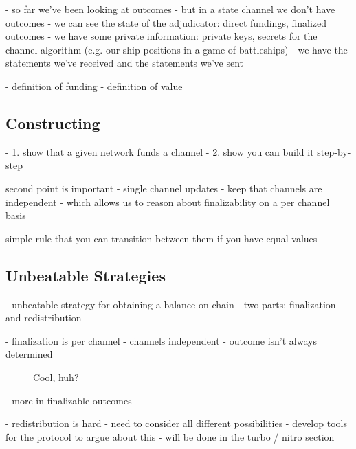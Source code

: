 \begin{figure}[h]\centering
  \makebox[\textwidth][c]{}
  \caption{
  }\label{fig:indirect-funding}
\end{figure}

- so far we've been looking at outcomes
- but in a state channel we don't have outcomes
- we can see the state of the adjudicator: direct fundings, finalized outcomes
- we have some private information: private keys, secrets for the channel algorithm (e.g. our ship positions in a game of battleships)
- we have the statements we've received and the statements we've sent

\begin{figure}[h]\centering
  \makebox[\textwidth][c]{}
  \caption{
  }\label{fig:system-state-direct-funding}
\end{figure}

- definition of funding
- definition of value


\subsection{Constructing}

- 1. show that a given network funds a channel
- 2. show you can build it step-by-step

second point is important
- single channel updates
- keep that channels are independent - which allows us to reason about finalizability on a per channel basis

simple rule that you can transition between them if you have equal values

\subsection{Unbeatable Strategies}

- unbeatable strategy for obtaining a balance on-chain
- two parts: finalization and redistribution

- finalization is per channel - channels independent
- outcome isn't always determined
\begin{figure}[h]\centering
  \makebox[\textwidth][c]{}
  \caption{Cool, huh?}
\end{figure}


- more in finalizable outcomes

- redistribution is hard
- need to consider all different possibilities
- develop tools for the protocol to argue about this
- will be done in the turbo / nitro section


